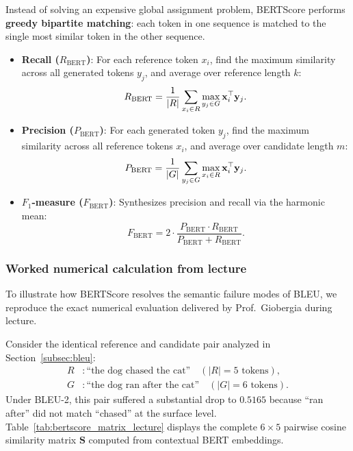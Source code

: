 \documentclass[../../main.tex]{subfiles}
\begin{document}
Instead of solving an expensive global assignment problem, BERTScore performs \textbf{greedy bipartite matching}: each token in one sequence is matched to the single most similar token in the other sequence.
\begin{itemize}
    \item \textbf{Recall ($R_{\text{BERT}}$)}: For each reference token $x_i$, find the maximum similarity across all generated tokens $y_j$, and average over reference length $k$:
    \begin{equation}
    \label{eq:bertscore_recall}
    R_{\text{BERT}} = \frac{1}{|R|} \sum_{x_i \in R} \max_{y_j \in G} \mathbf{x}_i^\top \mathbf{y}_j.
    \end{equation}
    \item \textbf{Precision ($P_{\text{BERT}}$)}: For each generated token $y_j$, find the maximum similarity across all reference tokens $x_i$, and average over candidate length $m$:
    \begin{equation}
    \label{eq:bertscore_precision}
    P_{\text{BERT}} = \frac{1}{|G|} \sum_{y_j \in G} \max_{x_i \in R} \mathbf{x}_i^\top \mathbf{y}_j.
    \end{equation}
    \item \textbf{$F_1$-measure ($F_{\text{BERT}}$)}: Synthesizes precision and recall via the harmonic mean:
    \begin{equation}
    \label{eq:bertscore_f1}
    F_{\text{BERT}} = 2 \cdot \frac{P_{\text{BERT}} \cdot R_{\text{BERT}}}{P_{\text{BERT}} + R_{\text{BERT}}}.
    \end{equation}
\end{itemize}

\subsubsection{Worked numerical calculation from lecture}
To illustrate how BERTScore resolves the semantic failure modes of BLEU, we reproduce the exact numerical evaluation delivered by Prof.~Giobergia during lecture.

Consider the identical reference and candidate pair analyzed in Section~\ref{subsec:bleu}:
\begin{align*}
R &: \text{``the dog chased the cat''} \quad (|R| = 5 \text{ tokens}), \\
G &: \text{``the dog ran after the cat''} \quad (|G| = 6 \text{ tokens}).
\end{align*}
Under BLEU-2, this pair suffered a substantial drop to $0.5165$ because ``ran after'' did not match ``chased'' at the surface level. Table~\ref{tab:bertscore_matrix_lecture} displays the complete $6 \times 5$ pairwise cosine similarity matrix $\mathbf{S}$ computed from contextual BERT embeddings.
\end{document}
